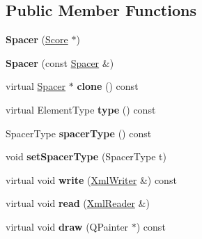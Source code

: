 \subsection*{Public Member Functions}
\begin{DoxyCompactItemize}
\item 
\mbox{\label{class_ms_1_1_spacer_afc51abc2d781d75bc7a0f4940ab191bb}} 
{\bfseries Spacer} (\hyperlink{class_ms_1_1_score}{Score} $\ast$)
\item 
\mbox{\label{class_ms_1_1_spacer_a453e8027ea64b73c268bc069914c4ac7}} 
{\bfseries Spacer} (const \hyperlink{class_ms_1_1_spacer}{Spacer} \&)
\item 
\mbox{\label{class_ms_1_1_spacer_a40568ca96793342e6ff69a59b04b4327}} 
virtual \hyperlink{class_ms_1_1_spacer}{Spacer} $\ast$ {\bfseries clone} () const
\item 
\mbox{\label{class_ms_1_1_spacer_ace496e7d7ebeb3de6f2952bc28d92748}} 
virtual Element\+Type {\bfseries type} () const
\item 
\mbox{\label{class_ms_1_1_spacer_a3ffe335bf95ba8e36cdc3c1dbb67ff36}} 
Spacer\+Type {\bfseries spacer\+Type} () const
\item 
\mbox{\label{class_ms_1_1_spacer_a63b96f292480a4aa6ef659f0a63c7e3f}} 
void {\bfseries set\+Spacer\+Type} (Spacer\+Type t)
\item 
\mbox{\label{class_ms_1_1_spacer_a04686e53013c6a74132c96a0fd7de85c}} 
virtual void {\bfseries write} (\hyperlink{class_ms_1_1_xml_writer}{Xml\+Writer} \&) const
\item 
\mbox{\label{class_ms_1_1_spacer_a7a702237bbdc8c3dd2662a2d76d8dd11}} 
virtual void {\bfseries read} (\hyperlink{class_ms_1_1_xml_reader}{Xml\+Reader} \&)
\item 
\mbox{\label{class_ms_1_1_spacer_ab3324a6ad96341ed4e7baa48f56c3e9b}} 
virtual void {\bfseries draw} (Q\+Painter $\ast$) const
\item 
\mbox{\label{class_ms_1_1_spacer_ac640d8cbe93db02051f48dd6647410ff}} 

\end{DoxyCompactItemize}
